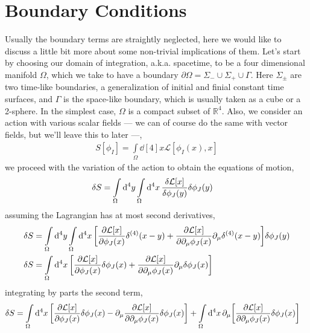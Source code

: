 \section{Boundary Conditions}

Usually the boundary terms are straightly neglected, here we would like to discuss a little bit more 
about some non-trivial implications of them. Let's start by choosing our domain of integration, a.k.a. spacetime, to be a four dimensional manifold $\Omega$, which we take to have a 
boundary $\partial\Omega = \Sigma_-\cup\Sigma_+\cup\Gamma$. Here $\Sigma_\pm$ are two time-like boundaries, a generalization of initial and finial constant time surfaces, and $\Gamma$ is the 
space-like boundary, which is usually taken as a cube or a 2-sphere. In the simplest case, $\Omega$ is a compact subset of $\mathbb R^4$. Also, we consider an action with various scalar fields --- 
we can of course do the same with vector fields, but we'll leave this to later ---,
\begin{align}
    S[\phi_I] = \int\limits_\Omega\dd[4]{x}\mathcal L[\phi_I(x),x]%
\end{align}
we proceed with the variation of the action to obtain the equations of motion,
\begin{align}
    \delta S&=\int\limits_{\Omega}\dd[4]{y}\int\limits_\Omega\dd[4]{x}\fdv{\mathcal L[x]}{\phi_J\qty(y)}\delta\phi_J(y)
\end{align}%
assuming the Lagrangian has at most second derivatives,
\begin{align}
    \delta S&=\int\limits_{\Omega}\dd[4]{y}\int\limits_\Omega\dd[4]{x}\qty[\pdv{\mathcal L[x]}{\phi_J\qty(x)}\delta^{(4)}\qty(x-y)+\pdv{\mathcal L[x]}{\partial_\mu\phi_J\qty(x)}\partial_\mu\delta^{(4)}\qty(x-y)]\delta\phi_J(y)\\%
    \delta S&=\int\limits_\Omega\dd[4]{x}\qty[\pdv{\mathcal L[x]}{\phi_J\qty(x)}\delta\phi_J\qty(x)+\pdv{\mathcal L[x]}{\partial_\mu\phi_J\qty(x)}\partial_\mu\delta\phi_J(x)]   
\end{align}
integrating by parts the second term,
\begin{align}
    \delta S&=\int\limits_\Omega\dd[4]{x}\qty[\pdv{\mathcal L[x]}{\phi_J\qty(x)}\delta\phi_J\qty(x)-\partial_\mu\pdv{\mathcal L[x]}{\partial_\mu\phi_J\qty(x)}\delta\phi_J(x)]+\int\limits_\Omega\dd[4]{x}\partial_\mu\qty[\pdv{\mathcal L[x]}{\partial_\mu\phi_J\qty(x)}\delta\phi_J(x)]
\end{align}
